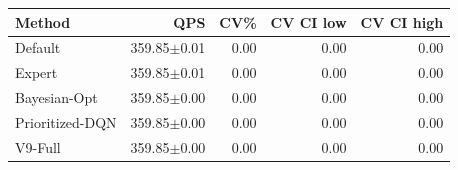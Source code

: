 \begin{tabular}{lrrrr}
\hline
Method & QPS & CV\% & CV CI low & CV CI high \\
\hline
Default & 359.85$\pm$0.01 & 0.00 & 0.00 & 0.00 \\
Expert & 359.85$\pm$0.01 & 0.00 & 0.00 & 0.00 \\
Bayesian-Opt & 359.85$\pm$0.00 & 0.00 & 0.00 & 0.00 \\
Prioritized-DQN & 359.85$\pm$0.00 & 0.00 & 0.00 & 0.00 \\
V9-Full & 359.85$\pm$0.00 & 0.00 & 0.00 & 0.00 \\
\hline
\end{tabular}